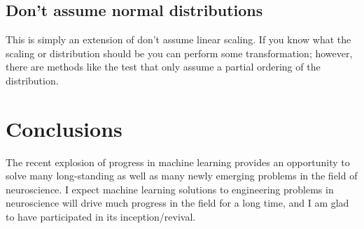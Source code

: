 \subsection{Don't assume normal distributions}
This is simply an extension of don't assume linear scaling. If you know what the scaling or distribution should be you can perform some transformation; however, there are methods like the \KS test that only assume a partial ordering of the distribution.

\section{Conclusions}
The recent explosion of progress in machine learning provides an opportunity to solve many long-standing as well as many newly emerging problems in the field of neuroscience. I expect machine learning solutions to engineering problems in neuroscience will drive much progress in the field for a long time, and I am glad to have participated in its inception/revival.